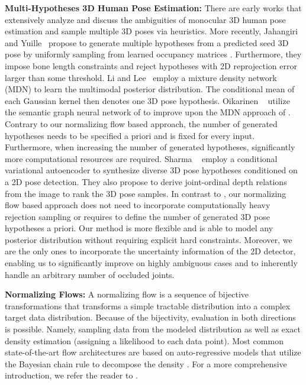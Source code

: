 \documentclass[10pt,twocolumn,letterpaper]{article}
\begin{document}
\textbf{Multi-Hypotheses 3D Human Pose Estimation:}
There are early works \cite{LeeCo04,Simo12,SmiTri01,SmiTri03} that extensively analyze and discuss the ambiguities of monocular 3D human pose estimation and sample multiple 3D poses via heuristics.
More recently, Jahangiri and Yuille~\cite{Jahangiri2017GeneratingMD} propose to generate multiple hypotheses from a predicted seed 3D pose by uniformly sampling from learned occupancy matrices \cite{Akhter_2015_CVPR}.
Furthermore, they impose bone length constraints and reject hypotheses with 2D reprojection error larger than some threshold. 
Li and Lee~\cite{Li_2019_CVPR} employ a mixture density network (MDN) \cite{370fbeadb5584ba9ab2938431fc4f140} to learn the multimodal posterior distribution.
The conditional mean of each Gaussian kernel then denotes one 3D pose hypothesis.
Oikarinen \etal~\cite{oikarinen2020graphmdn} utilize the semantic graph neural network of \cite{zhaoCVPR19semantic} to improve upon the MDN approach of \cite{Li_2019_CVPR}.
Contrary to our normalizing flow based approach, the number of generated hypotheses needs to be specified a priori and is fixed for every input.
Furthermore, when increasing the number of generated hypotheses, significantly more computational resources are required. Sharma \etal~\cite{Sharma_2019_ICCV} employ a conditional variational autoencoder to synthesize diverse 3D pose hypotheses conditioned on a 2D pose detection.
They also propose to derive joint-ordinal depth relations from the image to rank the 3D pose samples. 
In contrast to \cite{Jahangiri2017GeneratingMD}, our normalizing flow based approach does not need to incorporate computationally heavy rejection sampling or requires to define the number of generated 3D pose hypotheses a priori.
Our method is more flexible and is able to model any posterior distribution without requiring explicit hard constraints. 
Moreover, we are the only ones to incorporate the uncertainty information of the 2D detector, enabling us to significantly improve on highly ambiguous cases and to inherently handle an arbitrary number of occluded joints.

\textbf{Normalizing Flows:}
A normalizing flow \cite{pmlr-v37-rezende15,doi:10.1002/cpa.21423,tabak2010} is a sequence of bijective transformations that transforms a simple tractable distribution into a complex target data distribution.
Because of the bijectivity, evaluation in both directions is possible.
Namely, sampling data from the modeled distribution as well as exact density estimation (\ie assigning a likelihood to each data point).
Most common state-of-the-art flow architectures are based on auto-regressive models that utilize the Bayesian chain rule to decompose the density \cite{DBLP:journals/corr/DinhKB14,DBLP:conf/iclr/DinhSB17,pmlr-v37-germain15,NIPS2016_6581,NIPS2017_6828,RudWan2021}.
For a more comprehensive introduction, we refer the reader to \cite{kob2020NF}.
\end{document}
